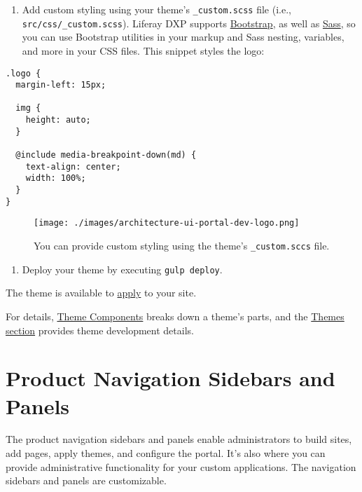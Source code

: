 \begin{enumerate}
\def\labelenumi{\arabic{enumi}.}
\setcounter{enumi}{3}
\tightlist
\item
  Add custom styling using your theme's \texttt{\_custom.scss} file
  (i.e., \texttt{src/css/\_custom.scss}). Liferay DXP supports
  \href{https://getbootstrap.com/}{Bootstrap}, as well as
  \href{https://sass-lang.com/}{Sass}, so you can use Bootstrap
  utilities in your markup and Sass nesting, variables, and more in your
  CSS files. This snippet styles the logo:
\end{enumerate}

\begin{verbatim}
.logo {
  margin-left: 15px;

  img {
    height: auto;
  }

  @include media-breakpoint-down(md) {
    text-align: center;
    width: 100%;
  }
}
\end{verbatim}

\begin{figure}
\centering
\texttt{[image: ./images/architecture-ui-portal-dev-logo.png]}
\caption{You can provide custom styling using the theme's
\texttt{\_custom.sccs} file.}
\end{figure}

\begin{enumerate}
\def\labelenumi{\arabic{enumi}.}
\setcounter{enumi}{4}
\tightlist
\item
  Deploy your theme by executing \texttt{gulp\ deploy}.
\end{enumerate}

The theme is available to
\href{/docs/7-2/frameworks/-/knowledge_base/f/deploying-and-applying-themes}{apply}
to your site.

For details,
\href{/docs/7-2/customization/-/knowledge_base/c/theme-components}{Theme
Components} breaks down a theme's parts, and the
\href{/docs/7-2/frameworks/-/knowledge_base/f/themes-introduction}{Themes
section} provides theme development details.

\section{Product Navigation Sidebars and
Panels}\label{product-navigation\noindent\hrulefills-and-panels}

The product navigation sidebars and panels enable administrators to
build sites, add pages, apply themes, and configure the portal. It's
also where you can provide administrative functionality for your custom
applications. The navigation sidebars and panels are customizable.

